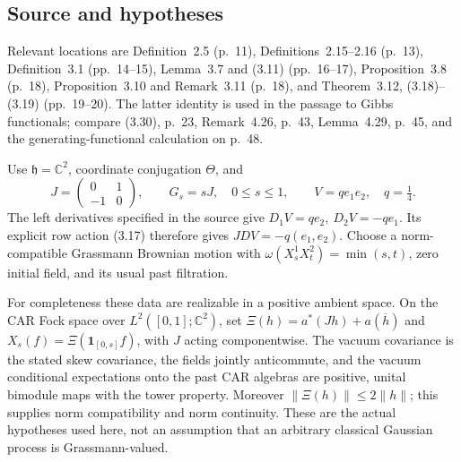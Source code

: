 \documentclass[10pt]{article}
\begin{document}
\subsection*{Source and hypotheses}
Relevant locations are Definition 2.5 (p. 11), Definitions 2.15–2.16 (p. 13), Definition 3.1 (pp. 14–15), Lemma 3.7 and (3.11) (pp. 16–17), Proposition 3.8 (p. 18), Proposition 3.10 and Remark 3.11 (p. 18), and Theorem 3.12, (3.18)–(3.19) (pp. 19–20). The latter identity is used in the passage to Gibbs functionals; compare (3.30), p. 23, Remark 4.26, p. 43, Lemma 4.29, p. 45, and the generating-functional calculation on p. 48.\par
Use \(\mathfrak h=\mathbb C^2\), coordinate conjugation \(\Theta\), and \[J=\begin{pmatrix}0&1\\-1&0\end{pmatrix},\qquad
 G_s=sJ,\quad 0\leq s\leq1,\qquad
 V=q e_1e_2,\quad q=\tfrac14.\] The left derivatives specified in the source give \(D_1V=q e_2,\ D_2V=-q e_1\). Its explicit row action (3.17) therefore gives \(JDV=-q(e_1,e_2)\). Choose a norm-compatible Grassmann Brownian motion with \(\omega(X_s^1X_t^2)=\min(s,t)\), zero initial field, and its usual past filtration.\par
For completeness these data are realizable in a positive ambient space. On the CAR Fock space over \(L^2([0,1];\mathbb C^2)\), set \(\Xi(h)=a^*(Jh)+a(\overline h)\) and \(X_s(f)=\Xi(\mathbf1_{[0,s]}f)\), with \(J\) acting componentwise. The vacuum covariance is the stated skew covariance, the fields jointly anticommute, and the vacuum conditional expectations onto the past CAR algebras are positive, unital bimodule maps with the tower property. Moreover \(\|\Xi(h)\|\leq2\|h\|\); this supplies norm compatibility and norm continuity. These are the actual hypotheses used here, not an assumption that an arbitrary classical Gaussian process is Grassmann-valued.\par
\end{document}

